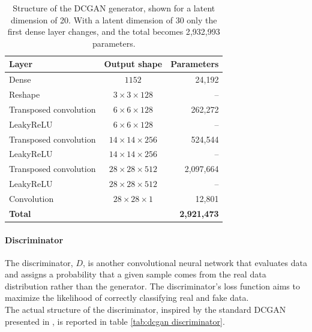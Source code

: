 \begin{table}[H]
    \centering
    \begin{tabular}{l c r}
    \textbf{Layer} & \textbf{Output shape} & \textbf{Parameters} \\
    \hline
    Dense & \( 1152 \) & 24{,}192 \\
    Reshape & \( 3 \times 3 \times 128 \) & -- \\
    Transposed convolution & \( 6 \times 6 \times 128 \) & 262{,}272 \\
    LeakyReLU & \( 6 \times 6 \times 128 \) & -- \\
    Transposed convolution & \( 14 \times 14 \times 256 \) & 524{,}544 \\
    LeakyReLU & \( 14 \times 14 \times 256 \) & -- \\
    Transposed convolution & \( 28 \times 28 \times 512 \) & 2{,}097{,}664 \\
    LeakyReLU & \( 28 \times 28 \times 512 \) & -- \\
    Convolution & \( 28 \times 28 \times 1 \) & 12{,}801 \\
    \hline
    \textbf{Total} & & \textbf{2{,}921{,}473} \\
    \end{tabular}
    \caption{Structure of the DCGAN generator, shown for a latent dimension of 20. With a latent dimension of 30 only the first dense layer changes, and the total becomes 2{,}932{,}993 parameters.}
    \label{tab:dcgan generator}
\end{table}

\paragraph{Discriminator}
\hfill \break
The discriminator, \( D \), is another convolutional neural network that evaluates data and assigns a probability that a given sample comes from the real data distribution rather than the generator. The discriminator's loss function aims to maximize the likelihood of correctly classifying real and fake data.
\\
The actual structure of the discriminator, inspired by the standard DCGAN presented in \cite{radford2016}, is reported in table \ref{tab:dcgan discriminator}.

